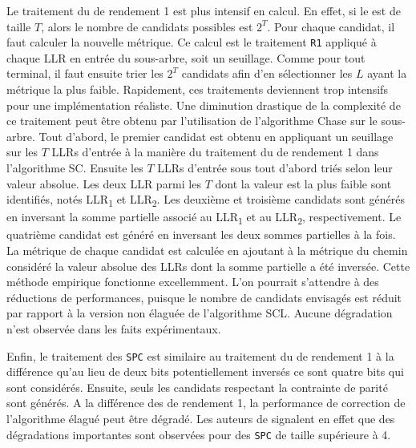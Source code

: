 Le traitement du \noeud de rendement 1 est plus intensif en calcul. En effet, si le \noeud est de taille $T$, alors le nombre de candidats possibles est $2^T$. Pour chaque candidat, il faut calculer la nouvelle métrique. Ce calcul est le traitement \texttt{R1} appliqué à chaque LLR en entrée du sous-arbre, soit un seuillage. Comme pour tout \noeud terminal, il faut ensuite trier les $2^T$ candidats afin d'en sélectionner les $L$ ayant la métrique la plus faible. Rapidement, ces traitements deviennent trop intensifs pour une implémentation réaliste. Une diminution drastique de la complexité de ce traitement peut être obtenu par l'utilisation de l'algorithme \og Chase \fg sur le sous-arbre. Tout d'abord, le premier candidat est obtenu en appliquant un seuillage sur les $T$ LLRs d'entrée à la manière du traitement du \noeud de rendement 1 dans l'algorithme SC. Ensuite les $T$ LLRs d'entrée sous tout d'abord triés selon leur valeur absolue. Les deux LLR parmi les $T$  dont la valeur est la plus faible sont identifiés, notés LLR\textsubscript{1} et LLR\textsubscript{2}. Les deuxième et troisième candidats sont générés en inversant la somme partielle associé au LLR\textsubscript{1} et au LLR\textsubscript{2}, respectivement. Le quatrième candidat est généré en inversant les deux sommes partielles à la fois. La métrique de chaque candidat est calculée en ajoutant à la métrique du chemin considéré la valeur absolue des LLRs dont la somme partielle a été inversée. Cette méthode empirique fonctionne excellemment. L'on pourrait s'attendre à des réductions de performances, puisque le nombre de candidats envisagés est réduit par rapport à la version non élaguée de l'algorithme SCL. Aucune dégradation n'est observée dans les faits expérimentaux.
 

Enfin, le traitement des \noeuds \texttt{SPC} est similaire au traitement du \noeud de rendement 1 à la différence qu'au lieu de deux bits potentiellement inversés ce sont quatre bits qui sont considérés. Ensuite, seuls les candidats respectant la contrainte de parité sont générés. A la différence des \noeuds de rendement 1, la performance de correction de l'algorithme élagué peut être dégradé. Les auteurs de \cite{sarkis_fast_2016} signalent en effet que des dégradations importantes sont observées pour des \noeuds \texttt{SPC} de taille supérieure à 4. 


